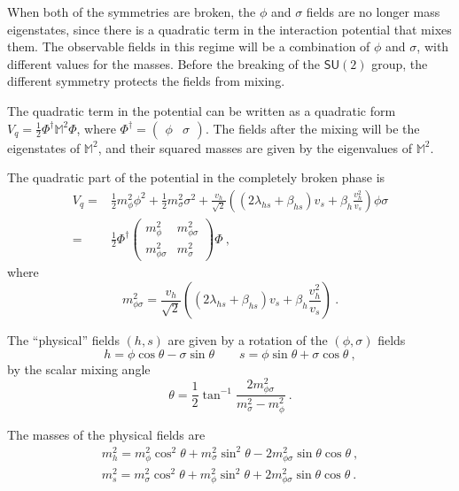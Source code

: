 \documentclass[aps,prd,preprintnumbers,nofootinbibn,twocolumn]{revtex4}
\begin{document}
When both of the symmetries are broken, the $\phi$ and $\sigma$ fields are no longer mass eigenstates, since there is a quadratic term in the interaction potential that mixes them. The observable fields in this regime will be a combination of $\phi$ and $\sigma$, with different values for the masses. Before the breaking of the $\mathsf{SU}(2)$ group, the different symmetry protects the fields from mixing.

The quadratic term in the potential can be written as a quadratic form $V_q = \frac{1}{2}\Phi^\dagger \mathbb{M}^2 \Phi$, where $\Phi^\dagger = \begin{pmatrix}\phi & \sigma \end{pmatrix} $. The fields after the mixing will be the eigenstates of $\mathbb{M}^2$, and their squared masses are given by the eigenvalues of $\mathbb{M}^2$.

The quadratic part of the potential in the completely broken phase is
\begin{align}
V_q =& \frac{1}{2} m_\phi^2 \phi^2  + \frac{1}{2} m_\sigma^2 \sigma^2 + \frac{v_h}{\sqrt{2}} \left((2\lambda_{hs} + \beta_{hs})v_s + \beta_h \frac{v_h^2}{v_s} \right) \phi \sigma \nonumber\\
=& \frac{1}{2} \Phi^\dagger \begin{pmatrix} m_\phi^2 & m_{\phi\sigma}^2\\ m_{\phi\sigma}^2  & m_\sigma^2 \end{pmatrix}\Phi\ ,
\end{align}
where
\begin{equation}
m_{\phi\sigma}^2 = \frac{v_h}{\sqrt{2}} \left((2\lambda_{hs} + \beta_{hs})v_s + \beta_h \frac{v_h^2}{v_s} \right)\ .
\end{equation} 



The ``physical'' fields $(h, s)$ are given by a rotation of the $(\phi, \sigma)$ fields 
\begin{equation}
h = \phi \cos \theta - \sigma \sin \theta \qquad s = \phi \sin \theta + \sigma \cos \theta\ ,
\end{equation}
by the scalar mixing angle 
\begin{equation}
\theta = \frac{1}{2} \tan^{-1} \frac{2m_{\phi\sigma}^2}{m_\sigma^2 - m_\phi^2}\ .
\end{equation}

The masses of the physical fields are
\begin{align}
m_h^2 = m_\phi^2 \cos^2 \theta + m_\sigma^2 \sin^2 \theta - 2 m_{\phi\sigma}^2 \sin \theta \cos \theta\ , \\
m_s^2 = m_\sigma^2 \cos^2 \theta + m_\phi^2 \sin^2 \theta + 2 m_{\phi\sigma}^2 \sin \theta \cos \theta\ .
\end{align}
\end{document}
